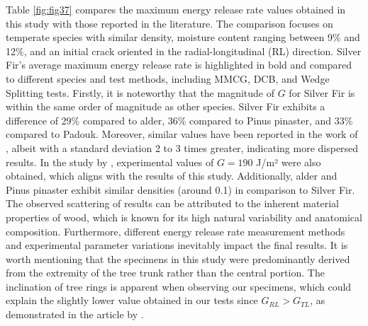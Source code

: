 \documentclass[3p,times,procedia]{elsarticle}
\begin{document}
Table \ref{fig:fig37} compares the maximum energy release rate values obtained in this study with those reported in the literature. The comparison focuses on temperate species with similar density, moisture content ranging between 9$\%$ and 12$\%$, and an initial crack oriented in the radial-longitudinal (RL) direction. Silver Fir's average maximum energy release rate is highlighted in bold and compared to different species and test methods, including MMCG, DCB, and Wedge Splitting tests.
Firstly, it is noteworthy that the magnitude of $G$ for Silver Fir is within the same order of magnitude as other species. Silver Fir exhibits a difference of 29$\%$ compared to alder, 36$\%$ compared to Pinus pinaster, and 33$\%$ compared to Padouk. Moreover, similar values have been reported in the work of \citet{Odounga2018phd}, albeit with a standard deviation 2 to 3 times greater, indicating more dispersed results. In the study by \citep{Xavieretal2014}, experimental values of $G=190$ J/m² were also obtained, which aligns with the results of this study. Additionally, alder and Pinus pinaster exhibit similar densities (around 0.1) in comparison to Silver Fir.
The observed scattering of results can be attributed to the inherent material properties of wood, which is known for its high natural variability and anatomical composition. Furthermore, different energy release rate measurement methods and experimental parameter variations inevitably impact the final results. It is worth mentioning that the specimens in this study were predominantly derived from the extremity of the tree trunk rather than the central portion. The inclination of tree rings is apparent when observing our specimens, which could explain the slightly lower value obtained in our tests since $G_{RL} > G_{TL}$, as demonstrated in the article by \citet{Reiterer2002}.
\end{document}
